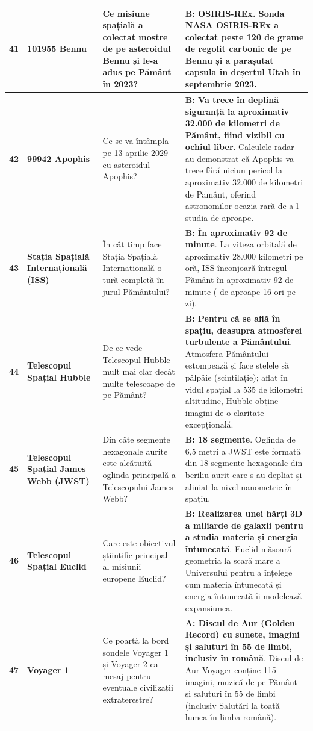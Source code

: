 \begin{longtable}{@{}r >{\raggedright\arraybackslash}p{2.7cm} >{\raggedright\arraybackslash}p{4.8cm} >{\raggedright\arraybackslash}p{6.5cm}@{}}
\textbf{41} & \textbf{101955 Bennu} & Ce misiune spațială a colectat mostre de pe asteroidul Bennu și le-a adus pe Pământ în 2023? & \textbf{B: OSIRIS-REx}. {\footnotesize Sonda NASA OSIRIS-REx a colectat peste 120 de grame de regolit carbonic de pe Bennu și a parașutat capsula în deșertul Utah în septembrie 2023.} \\ \midrule
\textbf{42} & \textbf{99942 Apophis} & Ce se va întâmpla pe 13 aprilie 2029 cu asteroidul Apophis? & \textbf{B: Va trece în deplină siguranță la aproximativ 32.000 de kilometri de Pământ, fiind vizibil cu ochiul liber}. {\footnotesize Calculele radar au demonstrat că Apophis va trece fără niciun pericol la aproximativ 32.000 de kilometri de Pământ, oferind astronomilor ocazia rară de a-l studia de aproape.} \\ \midrule
\textbf{43} & \textbf{Stația Spațială Internațională (ISS)} & În cât timp face Stația Spațială Internațională o tură completă în jurul Pământului? & \textbf{B: În aproximativ 92 de minute}. {\footnotesize La viteza orbitală de aproximativ 28.000 kilometri pe oră, ISS înconjoară întregul Pământ în aproximativ 92 de minute ( de aproape 16 ori pe zi).} \\ \midrule
\textbf{44} & \textbf{Telescopul Spațial Hubble} & De ce vede Telescopul Hubble mult mai clar decât multe telescoape de pe Pământ? & \textbf{B: Pentru că se află în spațiu, deasupra atmosferei turbulente a Pământului}. {\footnotesize Atmosfera Pământului estompează și face stelele să \guillemotleft{}pâlpâie\guillemotright{} (scintilație); aflat în vidul spațial la 535 de kilometri altitudine, Hubble obține imagini de o claritate excepțională.} \\ \midrule
\textbf{45} & \textbf{Telescopul Spațial James Webb (JWST)} & Din câte segmente hexagonale aurite este alcătuită oglinda principală a Telescopului James Webb? & \textbf{B: 18 segmente}. {\footnotesize Oglinda de 6,5 metri a JWST este formată din 18 segmente hexagonale din beriliu aurit care s-au depliat și aliniat la nivel nanometric în spațiu.} \\ \midrule
\textbf{46} & \textbf{Telescopul Spațial Euclid} & Care este obiectivul științific principal al misiunii europene Euclid? & \textbf{B: Realizarea unei hărți 3D a miliarde de galaxii pentru a studia materia și energia întunecată}. {\footnotesize Euclid măsoară geometria la scară mare a Universului pentru a înțelege cum materia întunecată și energia întunecată îi modelează expansiunea.} \\ \midrule
\textbf{47} & \textbf{Voyager 1} & Ce poartă la bord sondele Voyager 1 și Voyager 2 ca mesaj pentru eventuale civilizații extraterestre? & \textbf{A: Discul de Aur (Golden Record) cu sunete, imagini și saluturi în 55 de limbi, inclusiv în română}. {\footnotesize Discul de Aur Voyager conține 115 imagini, muzică de pe Pământ și saluturi în 55 de limbi (inclusiv \guillemotleft{}Salutări la toată lumea\guillemotright{} în limba română).} \\ \midrule

\end{longtable}
